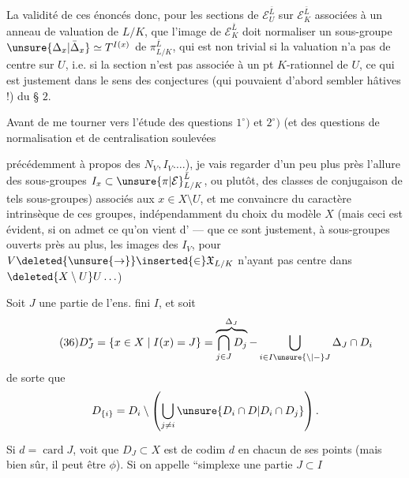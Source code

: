  La validité de ces énoncés   donc, pour les sections de $\mathcal E_U^{\bar L}$ sur $\mathcal E_K^{\bar L}$ associées à un anneau de valuation de $L/K$,  que l'image de $\mathcal E_K^{\bar L}$ doit normaliser un  sous-groupe $\unsure{\Delta_x|\bar\Delta_x}\simeq T^{I(x)}$ de $\pi_{L/K}^{\bar L}$, qui est non trivial si la valuation n'a pas de centre sur $U$, i.e. si la section n'est pas associée à un pt $K$-rationnel de $U$, ce qui est justement dans le sens des conjectures (qui pouvaient d'abord sembler hâtives !) du § $2$.

Avant de me tourner vers l'étude des questions $1^\circ)$ et $2^\circ)$ (et  des questions de normalisation et de centralisation soulevées


précédemment à propos des $N_V,I_V\ldots.$), je vais regarder d'un peu plus près l'allure des sous-groupes $I_x\subset{\unsure{\pi|\mathcal E}}_{L/K}^{\bar L}$, ou  plutôt, des classes de \inserted{$\pi$-}conjugaison de tels sous-groupes) associés aux $x\in X\setminus U$,  et me convaincre du caractère intrinsèque de ces groupes, indépendamment du choix du modèle $X$ (mais ceci est évident, si on admet ce qu'on vient d' --- que ce sont justement, à sous-groupes ouverts près  au plus, les images des $I_V$, pour $V\deleted{\unsure{\to}}\inserted{\in}\mathfrak X_{L/K}$ n'ayant pas  centre dans $\deleted{X\setminus U}U\ldots$)


Soit $J$ une partie de l'ens. fini $I$, et soit
\[
\tag{36}
D_J^*=\{x\in X\mid I(x)=J\}
=\overbrace{\bigcap_{j\in J}D_j}^{\Delta_J}-\bigcup_{i\in I\unsure{\setminus|-}J}\Delta_J\cap D_i
\]
de sorte que
\[
D_{\{i\}}=D_i\setminus\left(\bigcup_{j\ne i}\unsure{D_i\cap D|D_i\cap D_j}\right).
\]
Si $d=\operatorname{card}J$,  voit que $D_J\subset X$ est  de codim\textsuperscript{} $d$ en chacun de ses points (mais bien sûr, il peut être $\phi$). Si on appelle ``simplexe une partie $J\subset I$


